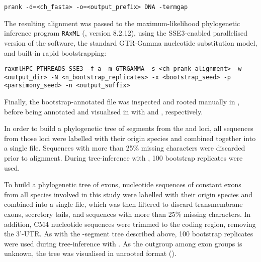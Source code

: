 \begin{lstlisting}
prank -d=<ch_fasta> -o=<output_prefix> DNA -termgap
\end{lstlisting}

\noindent The resulting alignment was passed to the maximum-likelihood phylogenetic inference program \lstinline{RAxML} (\parencite{stamatakis2005raxml3,stamatakis2006raxml6,stamatakis2014raxml8}, version 8.2.12), using the SSE3-enabled parallelised version of the software, the standard GTR-Gamma nucleotide substitution model, and built-in rapid bootstrapping:

\begin{lstlisting}
raxmlHPC-PTHREADS-SSE3 -f a -m GTRGAMMA -s <ch_prank_alignment> -w <output_dir> -N <n_bootstrap_replicates> -x <bootstrap_seed> -p <parsimony_seed> -n <output_suffix>
\end{lstlisting} 

\noindent Finally, the bootstrap-annotated  file was inspected and rooted manually in  \parencite{rambaut2012figtree}, before being annotated and visualised in  with  and , respectively.


\noindent In order to build a phylogenetic tree of \vh segments from the \Nfu and \Xma \igh{} loci, all \vh sequences from those loci were labelled with their origin species and combined together into a single  file. Sequences with more than 25\% missing characters were discarded prior to  alignment. During tree-inference with , 100 bootstrap replicates were used.


\noindent To build a phylogenetic tree of \ch exons, nucleotide sequences of constant exons from all species involved in this study were labelled with their origin species and combined into a single  file, which was then filtered to discard transmembrane exons, secretory tails, and sequences with more than 25\% missing characters. In addition, CM4 nucleotide sequences were trimmed to the coding region, removing the 3'-UTR. As with the \vh-segment tree described above, 100 bootstrap replicates were used during tree-inference with . As the outgroup among \ch exon groups is unknown, the tree was visualised in unrooted format ().



